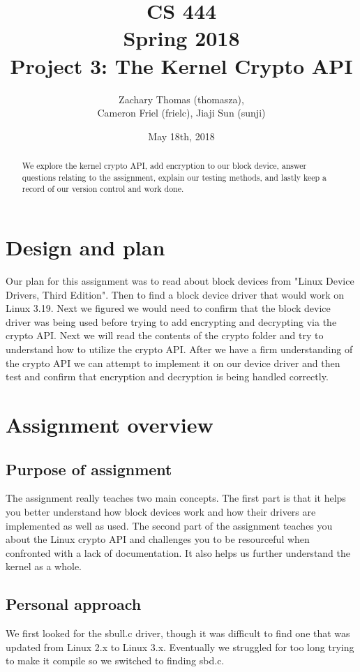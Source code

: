 \documentclass[journal,10pt,onecolumn,letterpaper,draftclsnofoot]{IEEEtran}
\title{CS 444 \\ Spring 2018  \\ Project 3: The Kernel Crypto API}
\author{Zachary Thomas (thomasza),\\ Cameron Friel (frielc), Jiaji Sun (sunji)}
\date{May 18th, 2018}
\begin{document}
\maketitle
\begin{abstract}
We explore the kernel crypto API, add encryption to our block device, answer questions relating to the assignment, explain our testing methods, and lastly keep a record of our version control and work done.
\end{abstract}
    
\newpage
\tableofcontents
\newpage

\section{Design and plan}
Our plan for this assignment was to read about block devices from "Linux Device Drivers, Third Edition". Then to find a block device driver that would work on Linux 3.19. Next we figured we would need to confirm that the block device driver was being used before trying to add encrypting and decrypting via the crypto API. Next we will read the contents of the crypto folder and try to understand how to utilize the crypto API. After we have a firm understanding of the crypto API we can attempt to implement it on our device driver and then test and confirm that encryption and decryption is being handled correctly.

\section{Assignment overview}

\subsection{Purpose of assignment}
The assignment really teaches two main concepts. The first part is that it helps you better understand how block devices work and how their drivers are implemented as well as used. The second part of the assignment teaches you about the Linux crypto API and challenges you to be resourceful when confronted with a lack of documentation. It also helps us further understand the kernel as a whole.

\subsection{Personal approach}
We first looked for the sbull.c driver, though it was difficult to find one that was updated from Linux 2.x to Linux 3.x. Eventually we struggled for too long trying to make it compile so we switched to finding sbd.c.
\end{document}
